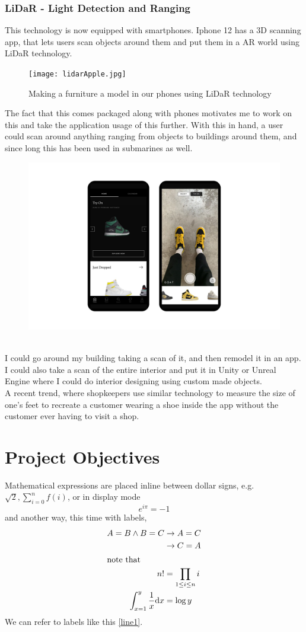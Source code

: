 \documentclass[a4paper]{report}
\begin{document}
\subsubsection{LiDaR - Light Detection and Ranging}
This technology is now equipped with smartphones. Iphone 12 has a 3D scanning app, that lets users scan objects around them and put them in a AR world using LiDaR technology.
\begin{figure}[h]
\texttt{[image: lidarApple.jpg]} 
\caption{Making a furniture a model in our phones using LiDaR technology}
\end{figure}
The fact that this comes packaged  along with phones motivates me to work on this and take the application usage of this further. With this in hand, a user could scan around anything ranging from objects to buildings around them, and since long this has been used in submarines as well.
\\
\begin{figure}
\includegraphics[scale=0.15]{GOAT.jpg} 
\end{figure}
\\
I could go around my building taking a scan of it, and then remodel it in an app. I could also take a scan of the entire interior and put it in Unity or Unreal Engine where I could do interior designing using custom made objects. 
\\

A recent trend, where shopkeepers use similar technology to measure the size of one's feet to recreate a customer wearing a shoe inside the app without the customer ever having to visit a shop. 
\newpage


\section{Project Objectives}
Mathematical expressions are placed inline between dollar signs, e.g. $\sqrt 2, \sum_{i=0}^nf(i)$, or in display mode
\[ e^{i\pi}=-1\] and another way, this time with labels,
\begin{align}
\label{line1} A=B\wedge B=C&\rightarrow A=C\\
&\rightarrow C=A\\
\intertext{note that}
n!&=\prod_{1\leq i\leq n}i \\
\int_{x=1}^y \frac 1 x \mathrm{d}x&=\log y
\end{align}
We can refer to labels like this \eqref{line1}.   
\end{document}
